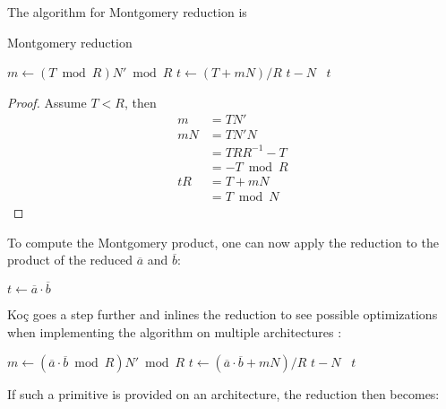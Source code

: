 \begin{thm}
  The algorithm for Montgomery reduction is
  \begin{algorithm}[hbt!]
    \caption{Montgomery reduction}
    \begin{algorithmic}
      \State $m \gets (T \bmod{R}) N' \bmod{R}$
      \State $t \gets (T + m N)/R$
       \Return $t - N$
      \Else \, \Return $t$
      \EndIf
      \EndFunction
    \end{algorithmic}
  \end{algorithm}
\end{thm}
\begin{proof}
  Assume $T < R$, then
  \begin{align*}
      m & = T N' \\
    m N & = T N' N \\
        & = T R R^{-1} - T \\
        & = - T \bmod{R} \\
    t R & = T + m N \\
        & = T \bmod{N}
  \end{align*}
\end{proof}

To compute the Montgomery product, one can now apply the reduction to
the product of the reduced $\overline{a}$ and $\overline{b}$:
\begin{algorithmic}
    \State $t \gets \overline{a} \cdot \overline{b}$
    \State \Return {}
  \EndFunction
\end{algorithmic}

Ko\c{c} goes a step further and inlines the reduction to see possible
optimizations when implementing the algorithm on multiple
architectures \cite{Koc}:

\begin{algorithm}[hbt!]
  \begin{algorithmic}
      \State $m \gets (\overline{a} \cdot \overline{b} \bmod{R}) N' \bmod{R}$
      \State $t \gets (\overline{a} \cdot \overline{b} + m N)/R$
       \Return $t - N$
      \Else \, \Return $t$
      \EndIf 
   \EndFunction
  \end{algorithmic}
\end{algorithm}

If such a primitive is provided on an architecture, the reduction then
becomes:


